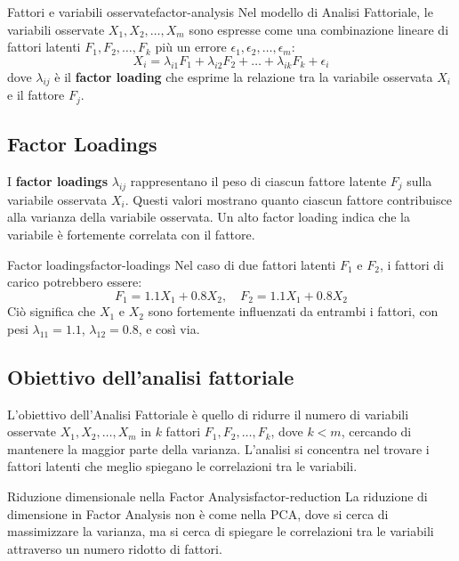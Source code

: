 \begin{definizione}{Fattori e variabili osservate}{factor-analysis}
Nel modello di Analisi Fattoriale, le variabili osservate \( X_1, X_2, \dots,
X_m \) sono espresse come una combinazione lineare di fattori latenti \( F_1,
F_2, \dots, F_k \) più un errore \( \epsilon_1, \epsilon_2, \dots, \epsilon_m
\):
\[
X_i = \lambda_{i1} F_1 + \lambda_{i2} F_2 + \dots + \lambda_{ik} F_k +
\epsilon_i
\]
dove \( \lambda_{ij} \) è il \textbf{factor loading} che esprime la relazione
tra la variabile osservata \( X_i \) e il fattore \( F_j \).
\end{definizione}

\subsection{Factor Loadings}

I \textbf{factor loadings} \( \lambda_{ij} \) rappresentano il peso di ciascun
fattore latente \( F_j \) sulla variabile osservata \( X_i \). Questi valori
mostrano quanto ciascun fattore contribuisce alla varianza della variabile
osservata. Un alto factor loading indica che la variabile è fortemente
correlata con il fattore.

\begin{esempio}{Factor loadings}{factor-loadings}
Nel caso di due fattori latenti \( F_1 \) e \( F_2 \), i fattori di carico
potrebbero essere:
\[
F_1 = 1.1 X_1 + 0.8 X_2, \quad F_2 = 1.1 X_1 + 0.8 X_2
\]
Ciò significa che \( X_1 \) e \( X_2 \) sono fortemente influenzati da entrambi
i fattori, con pesi \( \lambda_{11} = 1.1 \), \( \lambda_{12} = 0.8 \), e così
via.
\end{esempio}

\subsection{Obiettivo dell'analisi fattoriale}

L'obiettivo dell'Analisi Fattoriale è quello di ridurre il numero di variabili
osservate \( X_1, X_2, \dots, X_m \) in \( k \) fattori \( F_1, F_2, \dots, F_k
\), dove \( k < m \), cercando di mantenere la maggior parte della varianza.
L'analisi si concentra nel trovare i fattori latenti che meglio spiegano le
correlazioni tra le variabili.

\begin{nota}{Riduzione dimensionale nella Factor Analysis}{factor-reduction}
La riduzione di dimensione in Factor Analysis non è come nella PCA, dove si
cerca di massimizzare la varianza, ma si cerca di spiegare le correlazioni tra
le variabili attraverso un numero ridotto di fattori.
\end{nota}

